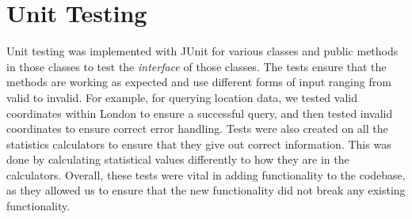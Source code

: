 \section{Unit Testing}
Unit testing was implemented with JUnit for various classes and public methods in those classes to test the \textit{interface} of those classes. The tests ensure that the methods are working as expected and use different forms of input ranging from valid to invalid. For example, for querying location data, we tested valid coordinates within London to ensure a successful query, and then tested invalid coordinates to ensure correct error handling. Tests were also created on all the statistics calculators to ensure that they give out correct information. This was done by calculating statistical values differently to how they are in the calculators. Overall, these tests were vital in adding functionality to the codebase, as they allowed us to ensure that the new functionality did not break any existing functionality.
